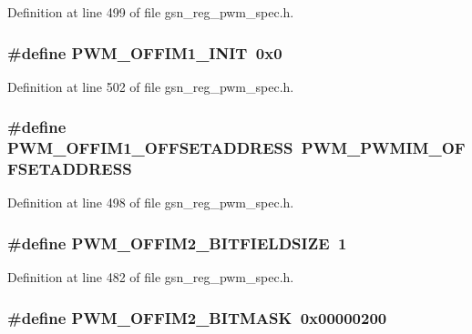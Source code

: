 Definition at line 499 of file gsn\_\-reg\_\-pwm\_\-spec.h.

\hypertarget{a00565_a6b3ea49e054b5b22f00931a21f8215f7}{
\subsubsection[{PWM\_\-OFFIM1\_\-INIT}]{\setlength{\rightskip}{0pt plus 5cm}\#define PWM\_\-OFFIM1\_\-INIT~0x0}}
\label{a00565_a6b3ea49e054b5b22f00931a21f8215f7}


Definition at line 502 of file gsn\_\-reg\_\-pwm\_\-spec.h.

\hypertarget{a00565_ad71f32a8d545c6033402b2b62abe6120}{
\subsubsection[{PWM\_\-OFFIM1\_\-OFFSETADDRESS}]{\setlength{\rightskip}{0pt plus 5cm}\#define PWM\_\-OFFIM1\_\-OFFSETADDRESS~PWM\_\-PWMIM\_\-OFFSETADDRESS}}
\label{a00565_ad71f32a8d545c6033402b2b62abe6120}


Definition at line 498 of file gsn\_\-reg\_\-pwm\_\-spec.h.

\hypertarget{a00565_a21b3382fe6658a31067c9a968390c542}{
\subsubsection[{PWM\_\-OFFIM2\_\-BITFIELDSIZE}]{\setlength{\rightskip}{0pt plus 5cm}\#define PWM\_\-OFFIM2\_\-BITFIELDSIZE~1}}
\label{a00565_a21b3382fe6658a31067c9a968390c542}


Definition at line 482 of file gsn\_\-reg\_\-pwm\_\-spec.h.

\hypertarget{a00565_a995f38fa29e87f54611816509d4618d9}{
\subsubsection[{PWM\_\-OFFIM2\_\-BITMASK}]{\setlength{\rightskip}{0pt plus 5cm}\#define PWM\_\-OFFIM2\_\-BITMASK~0x00000200}}
\label{a00565_a995f38fa29e87f54611816509d4618d9}


